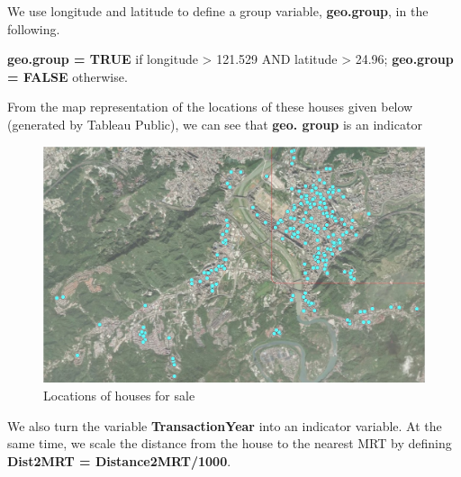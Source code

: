 \documentclass[
]{book}
\begin{document}
We use longitude and latitude to define a group variable, \textbf{geo.group}, in the following.

\textbf{geo.group = TRUE} if longitude \textgreater{} 121.529 AND latitude \textgreater{} 24.96;
\textbf{geo.group = FALSE} otherwise.

From the map representation of the locations of these houses given below (generated by Tableau Public), we can see that \textbf{geo. group} is an indicator

\begin{figure}

{\centering \includegraphics[width=0.8\linewidth]{img04/w04-map} 

}

\caption{Locations of houses for sale}\label{fig:unnamed-chunk-79}
\end{figure}

We also turn the variable \textbf{TransactionYear} into an indicator variable. At the same time, we scale the distance from the house to the nearest MRT by defining \textbf{Dist2MRT = Distance2MRT/1000}.
\end{document}
